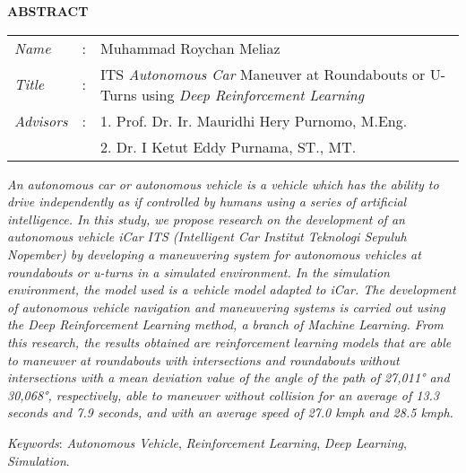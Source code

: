 \begin{center}
  \large\textbf{ABSTRACT}
\end{center}


\vspace{2ex}

\begingroup
  \setlength{\tabcolsep}{0pt}

  \noindent
  \begin{tabularx}{\textwidth}{l >{\centering}m{3em} X}
    \emph{Name}     &:& Muhammad Roychan Meliaz \\

    \emph{Title}    &:& ITS \textit{Autonomous Car} Maneuver at Roundabouts or U-Turns using \textit{Deep Reinforcement Learning} \\

    \emph{Advisors} &:& 1. Prof. Dr. Ir. Mauridhi Hery Purnomo, M.Eng. \\
                    & & 2. Dr. I Ketut Eddy Purnama, ST., MT. \\
  \end{tabularx}
\endgroup

\emph{An autonomous car or autonomous vehicle is a vehicle
	which has the ability to drive independently as if controlled by humans using a series of artificial intelligence. In this study, we propose research on the development of an autonomous vehicle iCar ITS (Intelligent Car Institut Teknologi Sepuluh Nopember) by developing a maneuvering system for autonomous vehicles at roundabouts or u-turns in a simulated environment. In the simulation environment, the model used is a vehicle model adapted to iCar. The development of autonomous vehicle navigation and maneuvering systems is carried out using the Deep Reinforcement Learning method, a branch of Machine Learning. From this research, the results obtained are reinforcement learning models that are able to maneuver at roundabouts with intersections and roundabouts without intersections with a mean deviation value of the angle of the path of 27,011° and 30,068°, respectively, able to maneuver without collision for an average of 13.3 seconds and 7.9 seconds, and with an average speed of 27.0 kmph and 28.5 kmph.}
	
	\iffalse
	it is hoped that reinforcement learning algorithms on autonomous cars can be produced that are able to maneuver at roundabouts or u-turns efficiently.
	\fi

\emph{Keywords}: \emph{Autonomous Vehicle}, \emph{Reinforcement Learning}, \emph{Deep Learning}, \emph{Simulation}.
